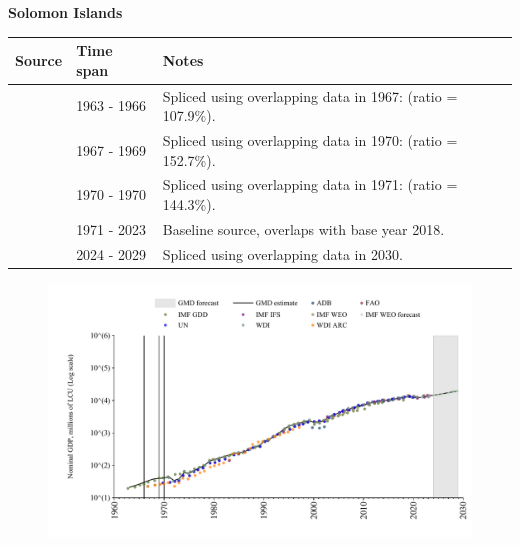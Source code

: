 \documentclass[12pt,a4paper,landscape]{article}
\begin{document}
\begin{adjustbox}{max totalsize={\paperwidth}{\paperheight},center}
\begin{minipage}[t][\textheight][t]{\textwidth}
\vspace*{0.5cm}
{}
\begin{center}
{\Large\bfseries Solomon Islands}
\end{center}
\vspace{0.5cm}
\begin{table}[H]
\centering
\small
\begin{tabular}{|l|l|l|}
\hline
\textbf{Source} & \textbf{Time span} & \textbf{Notes} \\
\hline
\rowcolor{white}\cite{IMF_GDD}& 1963 - 1966 &Spliced using overlapping data in 1967: (ratio = 107.9\%).\\
\rowcolor{lightgray}\cite{WDI}& 1967 - 1969 &Spliced using overlapping data in 1970: (ratio = 152.7\%).\\
\rowcolor{white}\cite{UN}& 1970 - 1970 &Spliced using overlapping data in 1971: (ratio = 144.3\%).\\
\rowcolor{lightgray}\cite{WDI}& 1971 - 2023 &Baseline source, overlaps with base year 2018.\\
\rowcolor{white}\cite{IMF_WEO_forecast}& 2024 - 2029 &Spliced using overlapping data in 2030.\\
\hline
\end{tabular}
\end{table}
\begin{figure}[H]
\centering
\includegraphics[width=\textwidth,height=0.6\textheight,keepaspectratio]{graphs/SLB_nGDP.pdf}
\end{figure}
\end{minipage}
\end{adjustbox}
\end{document}
